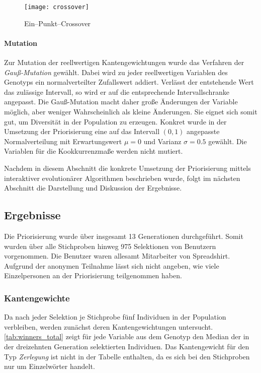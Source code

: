 \begin{figure}
\centering
\texttt{[image: crossover]}
\caption{Ein--Punkt--Crossover}
\label{fig:crossover}
\end{figure}

\paragraph{Mutation}

Zur Mutation der reellwertigen Kantengewichtungen wurde das Verfahren der \emph{Gauß-Mutation} \cite{kw2007} gewählt. Dabei wird zu jeder reellwertigen Variablen des Genotyps ein normalverteilter Zufallswert addiert. Verlässt der entstehende Wert das zulässige Intervall, so wird er auf die entsprechende Intervallschranke angepasst. Die Gauß-Mutation macht daher große Änderungen der Variable möglich, aber weniger Wahrscheinlich als kleine Änderungen. Sie eignet sich somit gut, um Diversität in der Population zu erzeugen. Konkret wurde in der Umsetzung der Priorisierung eine auf das Intervall \((0,1)\) angepasste Normalverteilung mit Erwartungswert \(\mu=0\) und Varianz \(\sigma=0.5\) gewählt. Die Variablen für die Kookkurrenzmaße werden nicht mutiert.

Nachdem in diesem Abschnitt die konkrete Umsetzung der Priorisierung mittels interaktiver evolutionärer Algorithmen beschrieben wurde, folgt im nächsten Abschnitt die Darstellung und Diskussion der Ergebnisse.

\subsection{Ergebnisse}

Die Priorisierung wurde über insgesamt \num{13} Generationen durchgeführt. Somit wurden über alle Stichproben hinweg \num{975} Selektionen von Benutzern vorgenommen. Die Benutzer waren allesamt Mitarbeiter von Spreadshirt. Aufgrund der anonymen Teilnahme lässt sich nicht angeben, wie viele Einzelpersonen an der Priorisierung teilgenommen haben.

\subsubsection{Kantengewichte}

Da nach jeder Selektion je Stichprobe fünf Individuen in der Population verbleiben, werden zunächst deren Kantengewichtungen untersucht. \cref{tab:winners_total} zeigt für jede Variable aus dem Genotyp den Median der in der dreizehnten Generation selektierten Individuen. Das Kantengewicht für den Typ \emph{Zerlegung} ist nicht in der Tabelle enthalten, da es sich bei den Stichproben nur um Einzelwörter handelt.

